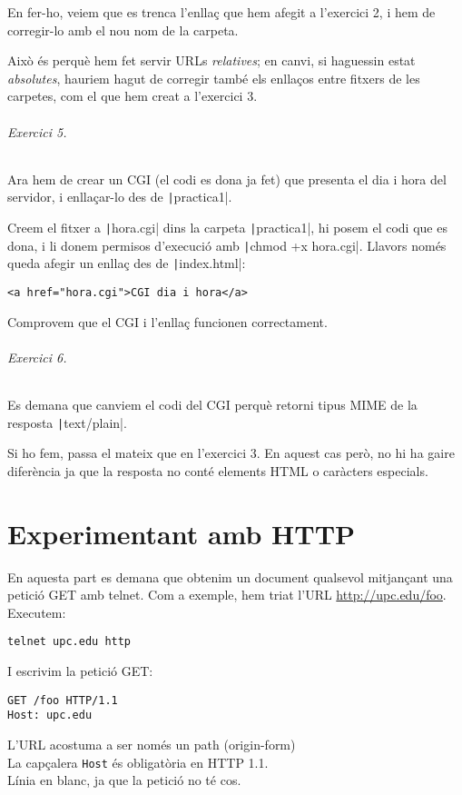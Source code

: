 \documentclass[catalan, a4paper]{scrartcl}
\begin{document}
En fer-ho, veiem que es trenca l'enllaç que hem afegit a l'exercici 2, i hem de
corregir-lo amb el nou nom de la carpeta.

Això és perquè hem fet servir URLs \emph{relatives}; en canvi, si haguessin estat
\emph{absolutes}, hauriem hagut de corregir també els enllaços entre fitxers de les
carpetes, com el que hem creat a l'exercici 3.


\paragraph{Exercici 5.} Ara hem de crear un CGI (el codi es dona ja fet)
que presenta el dia i hora del servidor, i enllaçar-lo des de \texttt|practica1|.

Creem el fitxer a \texttt|hora.cgi| dins la carpeta \texttt|practica1|,
hi posem el codi que es dona, i li donem permisos d'execució amb \texttt|chmod +x hora.cgi|.
Llavors només queda afegir un enllaç des de \texttt|index.html|:
\begin{verbatim}
<a href="hora.cgi">CGI dia i hora</a>
\end{verbatim}
Comprovem que el CGI i l'enllaç funcionen correctament.

\paragraph{Exercici 6.} Es demana que canviem el codi del CGI perquè retorni
tipus MIME de la resposta \texttt|text/plain|.

Si ho fem, passa el mateix que en l'exercici 3. En aquest cas però,
no hi ha gaire diferència ja que la resposta no conté elements HTML o
caràcters especials.



\part{Experimentant amb HTTP}

En aquesta part es demana que obtenim un document qualsevol mitjançant
una petició GET amb telnet. Com a exemple, hem triat l'URL \url{http://upc.edu/foo}.
Executem:

\begin{verbatim}
telnet upc.edu http
\end{verbatim}

I escrivim la petició GET:

\begin{minipage}[b]{0.47\columnwidth}
\begin{verbatim}
GET /foo HTTP/1.1
Host: upc.edu

\end{verbatim}
\end{minipage}
\begin{minipage}{0.53\columnwidth}
\color{darkgray}\small{}
L'URL acostuma a ser només un path (origin-form) \\
La capçalera \texttt{Host} és obligatòria en HTTP 1.1.\\
Línia en blanc, ja que la petició no té cos.
\end{minipage}
\end{document}
